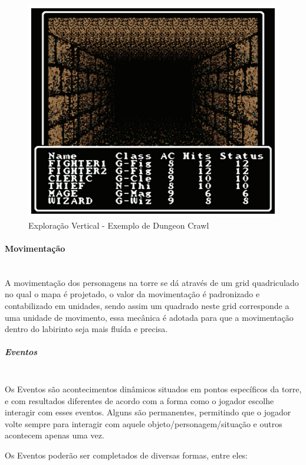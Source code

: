 \documentclass[11pt]{article} %
\begin{document}
\begin{figure}[!htp]
\centering
\includegraphics[scale=0.3]{res/Dungeon_Crawler.png}
\caption{Exploração Vertical - Exemplo de Dungeon Crawl}
\label{Exploração Vertical - Exemplo de Dungeon Crawl}
\end{figure}

\paragraph{Movimentação} \mbox{}\\
A movimentação dos personagens na torre se dá através de um grid quadriculado no qual o mapa é projetado, o valor da movimentação é padronizado e contabilizado em unidades, sendo assim um quadrado neste grid corresponde a uma unidade de movimento, essa mecânica é adotada para que a movimentação dentro do labirinto seja mais fluída e precisa.

\subparagraph{Eventos} \mbox{}\\
Os Eventos são acontecimentos dinâmicos situados em pontos específicos da torre, e com resultados diferentes de acordo com a forma como o jogador escolhe interagir com esses eventos. Alguns são permanentes, permitindo que o jogador volte sempre para interagir com aquele objeto/personagem/situação e outros acontecem apenas uma vez.

Os Eventos poderão ser completados de diversas formas, entre eles:
\end{document}
